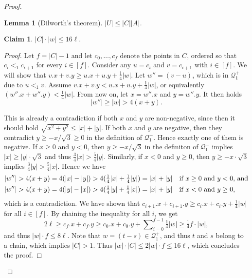 \documentclass[11pt, letterpaper]{article}
\theoremstyle{plain}
\newtheorem{lemma}{Lemma}
\theoremstyle{definition}
\newtheorem{claim}{Claim}
\theoremstyle{remark}
\newcommand{\Q}{\mathcal{Q}}
\newcommand{\absolute}[1]{\lvert#1\rvert}
\begin{document}
\begin{proof}
\begin{lemma}[Dilworth's theorem]\label{dilworth}
	$|U| \le |C| |A|$.
\end{lemma}

\begin{claim}\label{C_ineq}
	$\absolute{C} \cdot \absolute{w} \leq 16\ell$. 
	\begin{proof}
		Let $f = |C| - 1$ and
		let $c_0, \dots, c_{f}$ denote the points in $C$, ordered so that $c_i <_1 c_{i + 1}$ for every $i \in [f]$.
		Consider any $u = c_i$ and $v = c_{i + 1}$ with $i \in [f]$. We will show that $v.x + v.y \geq u.x + u.y + \frac14\absolute{w}$. 		
		Let $w'' = (v - u)$, which is in $\Q_1^+$ due to $u <_1 v$. Assume $v.x + v.y < u.x + u.y + \frac14\absolute{w}$, or equivalently $(w''.x + w''.y) < \frac14\absolute{w}$. From now on, let $x = w''.x$ and $y = w''.y$. It then holds $$\absolute{w''} \geq \absolute{w} > 4(x + y).$$
		
		This is already a contradiction if both $x$ and $y$ are non-negative, since then it should hold $\sqrt{x^2 + y^2} \leq \absolute{x} + \absolute{y}$. If both $x$ and $y$ are negative, then they contradict $y \geq -x/\sqrt{3} \geq 0$ in the definition of $\Q_1^-$. Hence exactly one of them is negative. If $x \geq 0$ and $y < 0$, then $y \geq -x / \sqrt{3}$ in the definiton of $\Q_1^-$ implies $\absolute{x} \geq \absolute{y}\cdot \sqrt{3}$ and thus $\frac34\absolute{x} > \frac54\absolute{y}$. Similarly, if $x < 0$ and $y \geq 0$, then $y \geq -x \cdot \sqrt{3}$ implies $\frac34\absolute{y} > \frac54\absolute{x}$. Hence we have
	\begin{alignat*}{1}	
		\absolute{w''} > 4(x + y) = 
		4(\absolute{x} - \absolute{y}) > 
		4(\tfrac14\absolute{x} + \tfrac14\absolute{y}) = 
		\absolute{x} + \absolute{y}&\text{\quad if $x \geq 0$ and $y < 0$, and}\\
		\absolute{w''} > 4(x + y) = 
		4(\absolute{y} - \absolute{x}) > 
		4(\tfrac14\absolute{y} + \tfrac14\absolute{x}) = 
		\absolute{x} + \absolute{y}&\text{\quad if $x < 0$ and $y \geq 0$,}
	\end{alignat*}
	which is a contradiction.
	We have shown that $c_{i + 1}.x + c_{i + 1}.y \geq c_i.x + c_i.y + \frac14\absolute{w}$ for all $i \in [f]$. By chaining the inequality for all $i$, we get $$2\ell \geq c_f.x + c_f.y \geq c_0.x + c_0.y + \sum\nolimits_{i = 0}^{f - 1} \tfrac14\absolute{w} \geq \tfrac14f\cdot{\absolute{w}},$$ and thus $\absolute{w} \cdot f \leq 8\ell$. Note that $w = (t - s) \in \Q_1^+$, and thus $t$ and $s$ belong to a chain, which implies $\absolute{C} > 1$. Thus $\absolute{w} \cdot \absolute{C} \leq 2\absolute{w} \cdot f \leq 16\ell$, which concludes the proof.
	\end{proof}%
\end{claim}


\end{proof}
\end{document}
